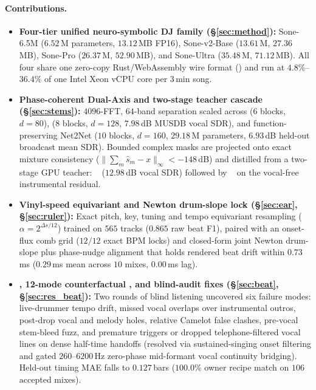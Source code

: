 \paragraph{Contributions.}
\begin{itemize}
  \item \textbf{Four-tier unified neuro-symbolic DJ family (\S\ref{sec:method}):} Sone-6.5M ($6.52$\,M parameters, $13.12$\,MB FP16), Sone-v2-Base ($13.61$\,M, $27.36$\,MB), Sone-Pro ($26.37$\,M, $52.90$\,MB), and Sone-Ultra ($35.48$\,M, $71.12$\,MB). All four share one zero-copy Rust/WebAssembly wire format () and run at $4.8\%$--$36.4\%$ of one Intel Xeon vCPU core per $3$\,min song.
  \item \textbf{Phase-coherent Dual-Axis  and two-stage teacher cascade (\S\ref{sec:stems}):} $4096$-FFT, $64$-band separation scaled across  ($6$ blocks, $d=80$),  ($8$ blocks, $d=128$, $7.98$\,dB MUSDB vocal SDR), and function-preserving Net2Net  ($10$ blocks, $d=160$, $29.18$\,M parameters, $6.93$\,dB held-out broadcast mean SDR). Bounded complex masks are projected onto exact mixture consistency ($\|\sum_m \hat{s}_m - x\|_\infty < -148$\,dB) and distilled from a two-stage GPU teacher: ~\citep{lu2024bsroformer} ($12.98$\,dB vocal SDR) followed by ~\citep{rouard2023hybrid} on the vocal-free instrumental residual.
  \item \textbf{Vinyl-speed equivariant  and Newton drum-slope lock (\S\ref{sec:ear}, \S\ref{sec:ruler}):} Exact pitch, key, tuning and tempo equivariant resampling ($\alpha = 2^{\Delta s/12}$) trained on $565$ tracks ($0.865$ raw beat F1), paired with an onset-flux comb grid ($12/12$ exact BPM locks) and closed-form joint Newton drum-slope plus phase-nudge alignment that holds rendered beat drift within $0.73$\,ms ($0.29$\,ms mean across $10$ mixes, $0.00$\,ms lag).
  \item \textbf{, 12-mode counterfactual , and blind-audit fixes (\S\ref{sec:beat}, \S\ref{sec:res_beat}):} Two rounds of blind listening uncovered six failure modes: live-drummer tempo drift, missed vocal overlaps over instrumental outros, post-drop vocal and melody holes, relative Camelot false clashes, pre-vocal stem-bleed fuzz, and premature triggers or dropped telephone-filtered vocal lines on dense half-time handoffs (resolved via sustained-singing onset filtering and gated $260$--$6200$\,Hz zero-phase mid-formant vocal continuity bridging). Held-out timing MAE falls to $0.127$\,bars ($100.0\%$ owner recipe match on $106$ accepted mixes).
\end{itemize}

